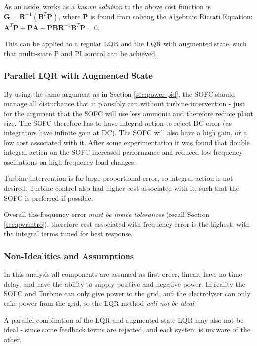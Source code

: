 As an aside,  works as a \emph{known solution} to the above cost function is $\bm{G} = \bm{R}^{-1} ( \bm{B}^T \bm{P})$, where $\bm{P}$ is found from solving the Algebraic Riccati Equation: $\bm{A}^T \bm{P} + \bm{P}\bm{A} - \bm{P}\bm{B}\bm{R}^{-1}\bm{B}^T\bm{P} = 0$. \cite{power:controlman}

This can be applied to a regular LQR and the LQR with augmented state, such that multi-state P and PI control can be achieved.

\subsubsection{Parallel LQR with Augmented State}

By using the same argument as in Section \ref{sec:power-pid}, the SOFC should manage all disturbance that it plausibly can without turbine intervention - just for the argument that the SOFC will use less ammonia and therefore reduce plant size.
The SOFC therefore has to have integral action to reject DC error (as integrators have infinite gain at DC).
The SOFC will also have a high gain, or a low cost associated with it.
After some experimentation it was found that double integral action on the SOFC increased performance and reduced low frequency oscillations on high frequency load changes.

Turbine intervention is for large proportional error, so integral action is not desired.
Turbine control also had higher cost associated with it, such that the SOFC is preferred if possible.

Overall the frequency error \emph{must be inside tolerances} (recall Section \ref{sec:pwrintro}), therefore cost associated with frequency error is the highest, with the integral terms tuned for best response.


\subsubsection{Non-Idealities and Assumptions}

In this analysis all components are assumed as first order, linear, have no time delay, and have the ability to supply positive and negative power.
In reality the SOFC and Turbine can only give power to the grid, and the electrolyser can only take power from the grid, so the LQR method \emph{will not be ideal}.

A parallel combination of the LQR and augmented-state LQR may also not be ideal - since some feedback terms are rejected, and each system is unaware of the other.

